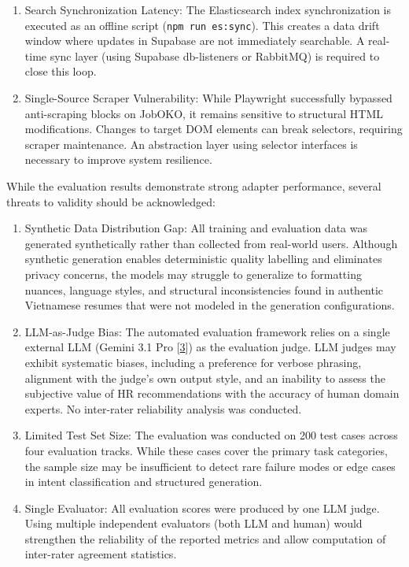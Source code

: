 \documentclass[12pt, a4paper]{report}
\begin{document}
\begin{enumerate}
    \item Search Synchronization Latency: The Elasticsearch index synchronization is executed as an offline script (\texttt{npm run es:sync}). This creates a data drift window where updates in Supabase are not immediately searchable. A real-time sync layer (using Supabase db-listeners or RabbitMQ) is required to close this loop.
    \item Single-Source Scraper Vulnerability: While Playwright successfully bypassed anti-scraping blocks on JobOKO, it remains sensitive to structural HTML modifications. Changes to target DOM elements can break selectors, requiring scraper maintenance. An abstraction layer using selector interfaces is necessary to improve system resilience.
\end{enumerate}

\vspace{0.8cm}
\vspace{0.4cm}

While the evaluation results demonstrate strong adapter performance, several threats to validity should be acknowledged:

\begin{enumerate}
    \item Synthetic Data Distribution Gap: All training and evaluation data was generated synthetically rather than collected from real-world users. Although synthetic generation enables deterministic quality labelling and eliminates privacy concerns, the models may struggle to generalize to formatting nuances, language styles, and structural inconsistencies found in authentic Vietnamese resumes that were not modeled in the generation configurations.
    \item LLM-as-Judge Bias: The automated evaluation framework relies on a single external LLM (Gemini 3.1 Pro [\hyperlink{cite3}{3}]) as the evaluation judge. LLM judges may exhibit systematic biases, including a preference for verbose phrasing, alignment with the judge's own output style, and an inability to assess the subjective value of HR recommendations with the accuracy of human domain experts. No inter-rater reliability analysis was conducted.
    \item Limited Test Set Size: The evaluation was conducted on 200 test cases across four evaluation tracks. While these cases cover the primary task categories, the sample size may be insufficient to detect rare failure modes or edge cases in intent classification and structured generation.
    \item Single Evaluator: All evaluation scores were produced by one LLM judge. Using multiple independent evaluators (both LLM and human) would strengthen the reliability of the reported metrics and allow computation of inter-rater agreement statistics.
\end{enumerate}
\end{document}

